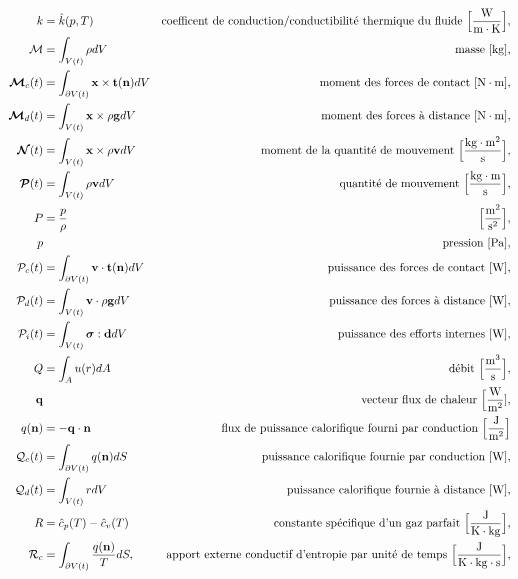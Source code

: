 \begin{align*}
      k &= \hat{k}(p,T) & \textrm{coefficent de conduction/conductibilité thermique du fluide } \Big[\si{\frac{W}{m\cdot K}} \Big],\\
      \mathcal{M} & = \int_{V(t)} \rho dV  & \textrm{masse [\si{kg}],}\\
      \bs{\mathcal{M}}_c (t) &= \int_{\partial V(t)} \vb{x} \times \vb{t}(\vb{n}) dV & \textrm{moment des forces de contact } [\si{N \cdot m}],\\
      \bs{\mathcal{M}}_d (t) &= \int_{V(t)} \vb{x} \times \rho \vb{g} dV & \textrm{moment des forces à distance } [\si{N \cdot m}],\\
      \bs{\mathcal{N}}(t) &= \int_{V(t)} \vb{x} \times \rho \vb{v} dV & \textrm{moment de la quantité de mouvement } \Big[\si{\frac{kg \cdot  m^2}{s}}\Big],\\
      \bs{\mathcal{P}}(t) &= \int_{V(t)} \rho \vb{v} dV & \textrm{quantité de mouvement } \Big[\si{\frac{kg \cdot m}{s}}\Big],\\
      P &= \frac{p}{\rho} & \Big[\si{\frac{m^2}{s^2}}\Big],\\
      p & & \textrm{pression } [\si{Pa}],\\
      \mathcal{P}_c(t) &= \int_{\partial V(t)} \vb{v} \cdot \vb{t}(\vb{n}) dV & \textrm{puissance des forces de contact } [\si{W}], \\
      \mathcal{P}_d(t) &= \int_{V(t)} \vb{v} \cdot \rho \vb{g} dV & \textrm{puissance des forces à distance } [\si{W}], \\
      \mathcal{P}_i(t) &= \int_{V(t)} \bs{\sigma} : \vb{d} dV & \textrm{puissance des efforts internes } [\si{W}],\\
      Q &= \int_A u(r) dA & \textrm{débit } \Big[\si{\frac{m^3}{s}}\Big],\\
      \vb{q} & & \textrm{vecteur flux de chaleur } \Big[\si{\frac{W}{m^2}}], \\
      q(\vb{n}) &= - \vb{q} \cdot \vb{n} & \textrm{flux de puissance calorifique fourni par conduction } \Big[\si{\frac{J}{m^2}}\Big]\\
      \mathcal{Q}_c(t) &= \int_{\partial V(t)} q(\vb{n}) dS & \textrm{puissance calorifique fournie par conduction } [\si{W}], \\
      \mathcal{Q}_d(t) &= \int_{V(t)} r dV & \textrm{puissance calorifique fournie à distance } [\si{W}], \\
      R &= \hat{c}_p(T) - \hat{c}_v(T) & \textrm{constante spécifique d'un gaz parfait } \Big[\si{\frac{J}{K \cdot kg}}\Big],\\
      \mathcal{R}_c &= \int_{\partial V(t)} \frac{q(\vb{n})}{T}dS, & \textrm{apport externe conductif d'entropie par unité de temps }\Big[\si{\frac{J}{K \cdot kg \cdot \s}}\Big],\\

\end{align*}
